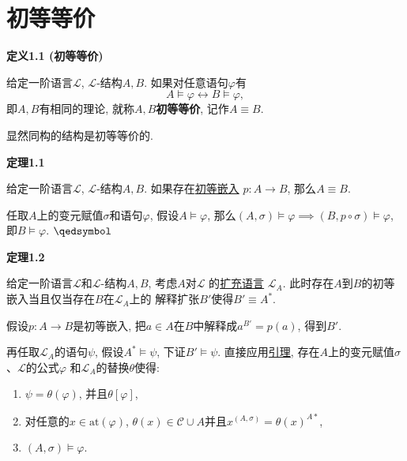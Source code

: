 \documentclass[UTF8]{ctexart}
\begin{document}
\setlength{\abovedisplayskip}{1pt}
\setlength{\belowdisplayskip}{1pt}

\section{初等等价}

\hypertarget{sec:定义1.1}{}
\noindent\textbf{定义1.1 (初等等价)}

给定一阶语言$\mathcal{L}$, $\mathcal{L}$-结构$A,B$. 如果对任意语句$\varphi$有
\[
    A\models\varphi\leftrightarrow B\models\varphi,
\]
即$A,B$有相同的理论, 就称$A,B$\textbf{初等等价}, 记作$A\equiv B$.

\vspace{10pt}

显然同构的结构是初等等价的.

\vspace{10pt}

\hypertarget{sec:定理1.1}{}
\noindent\textbf{定理1.1}

给定一阶语言$\mathcal{L}$, $\mathcal{L}$-结构$A,B$.
如果存在\href{01 初等嵌入#nameddest=sec:定义1.1}{初等嵌入} $p:A\to B$,
那么$A\equiv B$.


任取$A$上的变元赋值$\sigma$和语句$\varphi$, 假设$A\models\varphi$,
那么$(A,\sigma)\models\varphi\implies(B,p\circ\sigma)\models\varphi$,
即$B\models\varphi$. \hfill $\qedsymbol$

\vspace{10pt}

\hypertarget{sec:定理1.2}{}
\noindent\textbf{定理1.2}

给定一阶语言$\mathcal{L}$和$\mathcal{L}$-结构$A,B$, 考虑$A$对$\mathcal{L}$
的\href{../02 一阶语义/02 语言的限制与扩张#nameddest=sec:定义2.1}{扩充语言}
$\mathcal{L}_A$. 此时存在$A$到$B$的初等嵌入当且仅当存在$B$在$\mathcal{L}_A$上的
解释扩张$B'$使得$B'\equiv A^*$.



假设$p:A\to B$是初等嵌入, 把$a\in A$在$B$中解释成$a^{B'}=p(a)$, 得到$B'$.

再任取$\mathcal{L}_A$的语句$\psi$, 假设$A^*\models\psi$, 下证$B'\models\psi$.
直接应用\href{../02 一阶语义/04 替换定理#nameddest=sec:定理2.2}{引理},
存在$A$上的变元赋值$\sigma$、$\mathcal{L}$的公式$\varphi$
和$\mathcal{L}_A$的替换$\theta$使得:
\begin{enumerate}
    \item $\psi=\theta(\varphi)$, 并且$\theta[\varphi]$,
    \item 对任意的$x\in\mathrm{at}(\varphi)$,
    $\theta(x)\in\mathcal{C}\cup A$并且$x^{(A,\sigma)}=\theta(x)^{A*}$,
    \item $(A,\sigma)\models\varphi$.
\end{enumerate}
\end{document}
